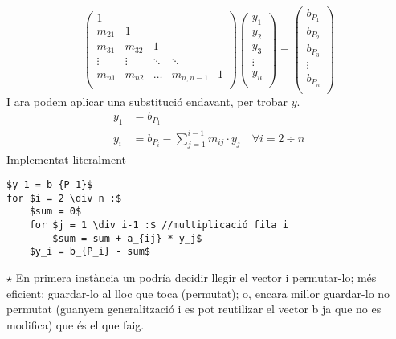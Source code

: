 \documentclass[a4paper,10pt]{article}
\begin{document}
\[
 \left(
  \begin{array}{ccccc}
  1			&			&		&		&		\\	
  m_{21}	&	1		&		&		&		\\
  m_{31}	&	m_{32}	&	1	&		&		\\
  \vdots	&	\vdots	&\ddots	&\ddots	& 		\\
  m_{n1}	&	m_{n2}	&\ldots	&	m_{n,n-1}&	1	\\
  \end{array}
  \right)
  \left(
  \begin{array}{c}
   y_1 \\
   y_2 \\
   y_3 \\
   \vdots \\
   y_n \\
  \end{array}
  \right)
  =
  \left(
  \begin{array}{c}
   b_{P_1} \\
   b_{P_2} \\
   b_{P_3} \\
   \vdots \\
   b_{P_n} \\
  \end{array}
  \right)
\]
I ara podem aplicar una substitució endavant, per trobar $y$.
\begin{align*}
  y_1 &= b_{P_1} \\
  y_i &= b_{P_i}-\sum_{j=1}^{i-1}m_{ij}\cdot y_j \quad \forall i = 2 \div n
\end{align*}
Implementat literalment
\begin{lstlisting}[mathescape]
$y_1 = b_{P_1}$
for $i = 2 \div n :$
    $sum = 0$
    for $j = 1 \div i-1 :$ //multiplicació fila i
        $sum = sum + a_{ij} * y_j$
    $y_i = b_{P_i} - sum$
\end{lstlisting}
$\star$ En primera instància un podría decidir llegir el vector i permutar-lo; més eficient: guardar-lo al lloc que toca (permutat); o, encara millor
guardar-lo no permutat (guanyem generalització i es pot reutilizar el vector b ja que no es modifica) que és el que faig.
\end{document}
